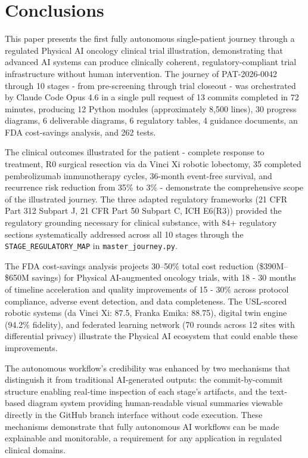 \documentclass{article}
\begin{document}
\section{Conclusions}
\label{sec:conclusions}

This paper presents the first fully autonomous single-patient journey through a regulated Physical AI oncology clinical trial illustration, demonstrating that advanced AI systems can produce clinically coherent, regulatory-compliant trial infrastructure without human intervention. The journey of PAT-2026-0042 through 10 stages - from pre-screening through trial closeout  - was orchestrated by Claude Code Opus 4.6 in a single pull request of 13 commits completed in 72 minutes, producing 12 Python modules (approximately 8,500 lines), 30 progress diagrams, 6 deliverable diagrams, 6 regulatory tables, 4 guidance documents, an FDA cost-savings analysis, and 262 tests.

The clinical outcomes illustrated for the patient - complete response to treatment, R0 surgical resection via da Vinci Xi robotic lobectomy, 35 completed pembrolizumab immunotherapy cycles, 36-month event-free survival, and recurrence risk reduction from 35\% to 3\% - demonstrate the comprehensive scope of the illustrated journey. The three adapted regulatory frameworks (21 CFR Part 312 Subpart J, 21 CFR Part 50 Subpart C, ICH E6(R3)) provided the regulatory grounding necessary for clinical substance, with 84+ regulatory sections systematically addressed across all 10 stages through the \texttt{STAGE\_REGULATORY\_MAP} in \texttt{master\_journey.py}.

The FDA cost-savings analysis projects 30--50\% total cost reduction (\$390M--\$650M savings) for Physical AI-augmented oncology trials, with 18 - 30 months of timeline acceleration and quality improvements of 15 - 30\% across protocol compliance, adverse event detection, and data completeness. The USL-scored robotic systems (da Vinci Xi: 87.5, Franka Emika: 88.75), digital twin engine (94.2\% fidelity), and federated learning network (70 rounds across 12 sites with differential privacy) illustrate the Physical AI ecosystem that could enable these improvements.

The autonomous workflow's credibility was enhanced by two mechanisms that distinguish it from traditional AI-generated outputs: the commit-by-commit structure enabling real-time inspection of each stage's artifacts, and the text-based diagram system providing human-readable visual summaries viewable directly in the GitHub branch interface without code execution. These mechanisms demonstrate that fully autonomous AI workflows can be made explainable and monitorable, a requirement for any application in regulated clinical domains.
\end{document}

